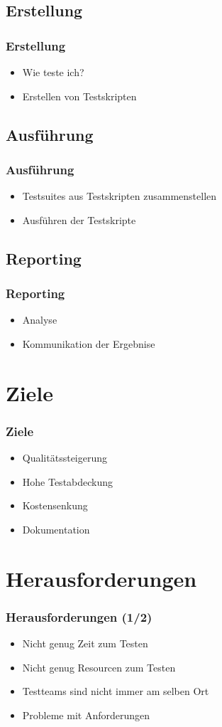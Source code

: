 \subsection{Erstellung}
\begin{frame}
	\frametitle{Erstellung}
	\begin{itemize}
		\item Wie teste ich?
		\item Erstellen von Testskripten
	\end{itemize}
\end{frame}

\subsection{Ausf\"uhrung}
\begin{frame}
	\frametitle{Ausf\"uhrung}
	\begin{itemize}
		\item Testsuites aus Testskripten zusammenstellen
		\item Ausf\"uhren der Testskripte
	\end{itemize}
\end{frame}

\subsection{Reporting}
\begin{frame}
	\frametitle{Reporting}
	\begin{itemize}
		\item Analyse
		\item Kommunikation der Ergebnise
	\end{itemize}
\end{frame}

\section{Ziele}
\begin{frame}
	\frametitle{Ziele}
	\begin{itemize}
		\item Qualit\"atssteigerung
		\item Hohe Testabdeckung
		\item Kostensenkung
		\item Dokumentation
	\end{itemize}
\end{frame}

\section{Herausforderungen}
\begin{frame}
	\frametitle{Herausforderungen (1/2)}
	\begin{itemize}
		\item Nicht genug Zeit zum Testen
		\item Nicht genug Resourcen zum Testen
		\item Testteams sind nicht immer am selben Ort
		\item Probleme mit Anforderungen
	\end{itemize}
\end{frame}

